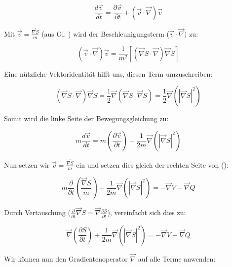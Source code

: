 \begin{equation}
    \frac{d\vec{v}}{dt} = \frac{\partial \vec{v}}{\partial t} + (\vec{v} \cdot \vec{\nabla}) \vec{v}
\end{equation}

Mit $\vec{v} = \frac{\vec{\nabla} S}{m}$ (aus Gl. ) wird der Beschleunigungsterm ($\vec{v} \cdot \vec{\nabla})$ zu:

\begin{equation}
    (\vec{v} \cdot \vec{\nabla}) \vec{v} = \frac{1}{m^2} \left[ (\vec{\nabla} S \cdot \vec{\nabla}) \vec{\nabla} S \right]
\end{equation}

Eine nützliche Vektoridentität hilft uns, diesen Term umzuschreiben:

\begin{equation}
    (\vec{\nabla} S \cdot \vec{\nabla}) \vec{\nabla} S = \frac{1}{2} \vec{\nabla} (\vec{\nabla} S \cdot \vec{\nabla} S) = \frac{1}{2} \vec{\nabla} (\left|\vec{\nabla} S \right|^2)
\end{equation}

Somit wird die linke Seite der Bewegungsgleichung zu:

\begin{equation}
    m \frac{d\vec{v}}{dt} = m \left( \frac{\partial \vec{v}}{\partial t} \right) + \frac{1}{2m} \vec{\nabla} (\left| \vec{\nabla} S \right|^2)
\end{equation}

Nun setzen wir $\vec{v} = \frac{\vec{\nabla} S}{m}$ ein und setzen dies gleich der rechten Seite von ():

\begin{equation}
    m \frac{\partial}{\partial t}\left( \frac{\vec{\nabla} S}{m} \right) + \frac{1}{2m} \vec{\nabla} (\left| \vec{\nabla} S \right|^2) = -\vec{\nabla} V - \vec{\nabla} Q
\end{equation}

Durch Vertauschung ($\frac{\partial}{\partial t} \vec{\nabla} S = \vec{\nabla} \frac{\partial S}{\partial t}$), vereinfacht sich dies zu:

\begin{equation}
    \vec{\nabla} \left( \frac{\partial S}{\partial t} \right) + \frac{1}{2m} \vec{\nabla} (\left| \vec{\nabla} S \right|^2) = -\vec{\nabla} V - \vec{\nabla} Q
\end{equation}

Wir können nun den Gradientenoperator $\vec{\nabla}$ auf alle Terme anwenden:

